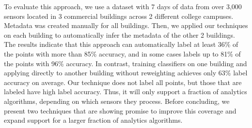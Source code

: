 To evaluate this approach, we use a dataset with 7 days of data from over 3,000
sensors located in 3 commercial buildings across 2 different college
campuses. Metadata was created manually for all buildings. Then, we applied our
techniques on each building to automatically infer the metadata of the other 2
buildings. The results indicate that this approach can automatically label at
least 36\% of the points with more than 85\% accuracy, and in some cases labels
up to 81\% of the points with 96\% accuracy. In contrast, training classifiers
on one building and applying directly to another building without reweighting
achieves only 63\% label accuracy on average. Our technique does not label all
points, but those that are labeled have high label accuracy. Thus, it will only
support a fraction of analytics algorithms, depending on which sensors they
process. Before concluding, we present two techniques that are showing promise
to improve this coverage and expand support for a larger fraction of analytics
algorithms.

